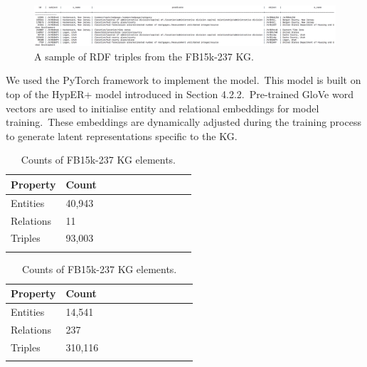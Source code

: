 \begin{figure}[H]
   	\centering
    	\includegraphics[width=1.0\textwidth, height=0.3\textwidth]{fb15k_237_fact_sample}
	\caption{A sample of RDF triples from the FB15k-237 KG.}
\end{figure}

\noindent We used the PyTorch framework to implement the model.\ This model is built on top of the HypER+ model introduced in Section 4.2.2.\ Pre-trained GloVe word vectors are used to initialise entity and relational embeddings for model training.\ These embeddings are dynamically adjusted during the training process to generate latent representations specific to the KG. \par

\begin{table}[H]
	\parbox{.5\linewidth}{
		\centering
		\begin{tabular}{lllllllllll}
  			\textbf{Property} & \textbf{Count}  \\
  			\hline
  			Entities & 40,943  \\
  			Relations & 11  \\
  			Triples & 93,003 \\
			&
		\end{tabular}
		\captionsetup{justification=centering}
		\caption{Counts of WN18RR KG elements.}
		}
	\hfill
	\parbox{.5\linewidth}{
		\centering
		\begin{tabular}{lllllllllll}
  			\textbf{Property} & \textbf{Count}  \\
  			\hline
  			Entities & 14,541   \\
  			Relations & 237  \\
  			Triples & 310,116  \\
			&
		\end{tabular}
		\captionsetup{justification=centering}
		\caption{Counts of FB15k-237 KG elements.}
		}
\end{table}


